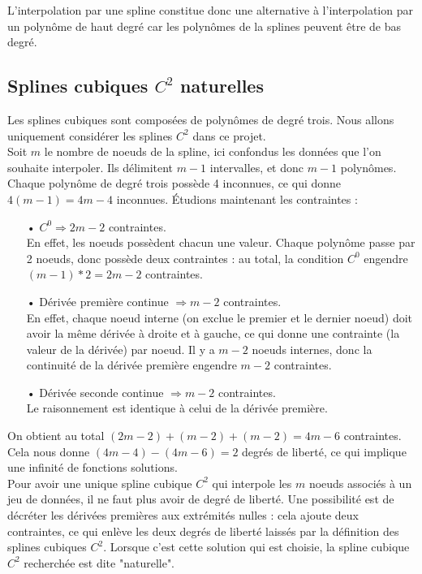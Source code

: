\documentclass[a4paper,12pt]{article} %
\begin{document}
	    L'interpolation par une spline constitue donc une alternative à l'interpolation par un polynôme de haut degré car les polynômes de la splines peuvent être de bas degré.\\
		
		\subsection{Splines cubiques $C^2$ naturelles}

            Les splines cubiques sont composées de polynômes de degré trois. Nous allons uniquement considérer les splines $C^2$ dans ce projet. \\
            
            Soit $m$ le nombre de noeuds de la spline, ici confondus les données que l'on souhaite interpoler. Ils délimitent $m-1$ intervalles, et donc $m-1$ polynômes. Chaque polynôme de degré trois possède 4 inconnues, ce qui donne $4(m-1) = 4m - 4$ inconnues. Étudions maintenant les contraintes : 
            \begin{itemize}
                \item[•] $C^0 \Rightarrow 2m-2$ contraintes.\\ 
                En effet, les noeuds possèdent chacun une valeur. Chaque polynôme passe par 2 noeuds, donc possède deux contraintes : au total, la condition $C^0$ engendre $(m-1)*2 = 2m-2$ contraintes. 
                \item[•] Dérivée première continue $\Rightarrow m-2$ contraintes. \\
                En effet, chaque noeud interne (on exclue le premier et le dernier noeud) doit avoir la même dérivée à droite et à gauche, ce qui donne une contrainte (la valeur de la dérivée) par noeud. Il y a $m-2$ noeuds internes, donc la continuité de la dérivée première engendre $m-2$ contraintes.
                \item[•] Dérivée seconde continue $\Rightarrow m-2$ contraintes. \\
                Le raisonnement est identique à celui de la dérivée première.
            \end{itemize}
            On obtient au total $(2m-2) + (m-2) + (m-2) = 4m-6$ contraintes. Cela nous donne $(4m-4) - (4m-6) = 2$ degrés de liberté, ce qui implique une infinité de fonctions solutions.\\
            
            Pour avoir une unique spline cubique $C^2$ qui interpole les $m$ noeuds associés à un jeu de données, il ne faut plus avoir de degré de liberté. Une possibilité est de décréter les dérivées premières aux extrémités nulles : cela ajoute deux contraintes, ce qui enlève les deux degrés de liberté laissés par la définition des splines cubiques $C^2$. Lorsque c'est cette solution qui est choisie, la spline cubique $C^2$ recherchée est dite "naturelle".
            
\end{document}
